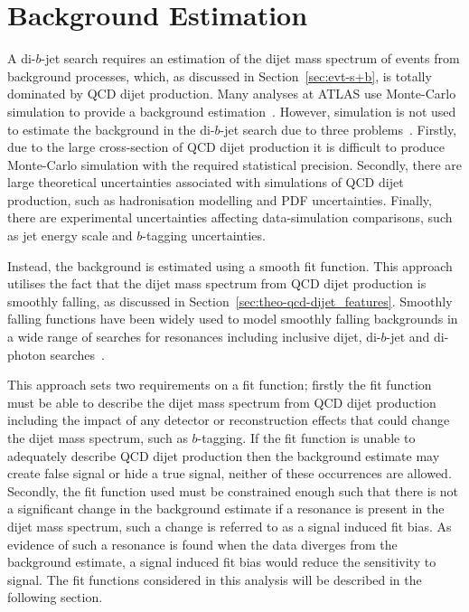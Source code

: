 

\section{Background Estimation}
\label{sec:bkg-fit}

A di-$b$-jet search requires an estimation of the dijet mass spectrum of events from background processes,
which, as discussed in Section~\ref{sec:evt-s+b}, is totally dominated by QCD dijet production.
Many analyses at ATLAS use Monte-Carlo simulation
to provide a background estimation~\cite{obj-Hbb}.
However, simulation is not used to estimate the
background in the di-$b$-jet search due to three problems~\cite{theo-dijet_harris}.
Firstly, due to the large cross-section of QCD dijet production it is difficult to produce Monte-Carlo simulation with the required statistical precision.
Secondly, there are large theoretical uncertainties associated with simulations of QCD dijet production,
such as hadronisation modelling and PDF uncertainties.
Finally, there are experimental uncertainties affecting
data-simulation comparisons, such as jet energy scale and $b$-tagging uncertainties.

Instead, the background is estimated using a smooth fit function.
This approach utilises the fact that the dijet mass spectrum
from QCD dijet production is smoothly falling,
as discussed in Section~\ref{sec:theo-qcd-dijet_features}.
Smoothly falling functions have been widely used to model smoothly falling backgrounds in a wide range of searches for resonances
including inclusive dijet, di-$b$-jet and di-photon searches~\cite{dijet-mori16_paper,dibjet-mori16_paper,bkg-higgs_gammagamma}.

This approach sets two requirements on a fit function;
firstly the fit function must be able to describe the dijet mass spectrum from QCD dijet production
including the impact of any detector or reconstruction effects that could change the dijet mass spectrum, such as $b$-tagging.
If the fit function is unable to adequately describe QCD dijet production then the background estimate may
create false signal or hide a true signal, neither of these occurrences are allowed.
Secondly, the fit function used must be constrained enough such that there is not a
significant change in the background estimate if a resonance is present in the dijet mass spectrum,
such a change is referred to as a signal induced fit bias.
As evidence of such a resonance is found when the data diverges from the background estimate,
a signal induced fit bias would reduce the sensitivity to signal.
The fit functions considered in this analysis will be described in the following section.

